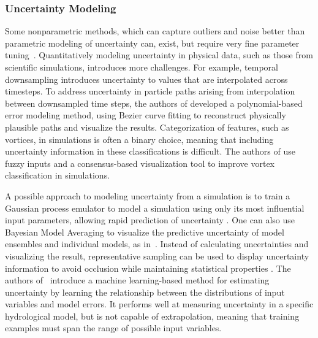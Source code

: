 \subsubsection{Uncertainty Modeling}
Some nonparametric methods, which can capture outliers and noise better than parametric modeling of uncertainty can, exist, but require very fine parameter tuning~\cite{curveboxplot}. Quantitatively modeling uncertainty in physical data, such as those from scientific simulations, introduces more challenges. For example, temporal downsampling introduces uncertainty to values that are interpolated across timesteps. To address uncertainty in particle paths arising from interpolation between downsampled time steps, the authors of \cite{chen2015uncertainty} developed a polynomial-based error modeling method, using Bezier curve fitting to reconstruct physically plausible paths and visualize the results. Categorization of features, such as vortices, in simulations is often a binary choice, meaning that including uncertainty information in these classifications is difficult. The authors of \cite{biswas2015uncertainty} use fuzzy inputs and a consensus-based visualization tool to improve vortex classification in simulations.

A possible approach to modeling uncertainty from a simulation is to train a Gaussian process emulator to model a simulation using only its most influential input parameters, allowing rapid prediction of uncertainty \cite{gomez2014dissecting}. One can also use Bayesian Model Averaging to visualize the predictive uncertainty of model ensembles and individual models, as in~\cite{gosink}. Instead of calculating uncertainties and visualizing the result, representative sampling can be used to display uncertainty information to avoid occlusion while maintaining statistical properties \cite{liu2017uncertainty}. The authors of~\cite{doi:10.1029/2008WR006839} introduce a machine learning-based method for estimating uncertainty by learning the relationship between the distributions of input variables and model errors. It performs well at measuring uncertainty in a specific hydrological model, but is not capable of extrapolation, meaning that training examples must span the range of possible input variables.



